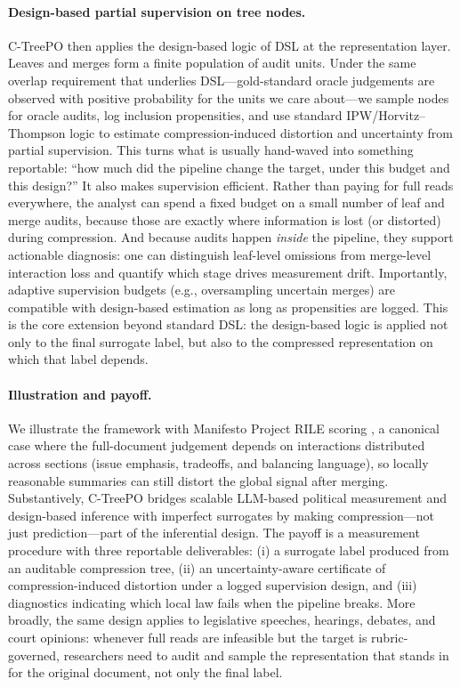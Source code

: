 \documentclass[11pt]{article}
\begin{document}
\paragraph{Design-based partial supervision on tree nodes.}
C-TreePO then applies the design-based logic of DSL at the representation layer. Leaves and merges form a finite population of audit units. Under the same overlap requirement that underlies DSL---gold-standard oracle judgements are observed with positive probability for the units we care about---we sample nodes for oracle audits, log inclusion propensities, and use standard IPW/Horvitz--Thompson logic to estimate compression-induced distortion and uncertainty from partial supervision. This turns what is usually hand-waved into something reportable: ``how much did the pipeline change the target, under this budget and this design?'' It also makes supervision efficient. Rather than paying for full reads everywhere, the analyst can spend a fixed budget on a small number of leaf and merge audits, because those are exactly where information is lost (or distorted) during compression. And because audits happen \emph{inside} the pipeline, they support actionable diagnosis: one can distinguish leaf-level omissions from merge-level interaction loss and quantify which stage drives measurement drift. Importantly, adaptive supervision budgets (e.g., oversampling uncertain merges) are compatible with design-based estimation as long as propensities are logged.
This is the core extension beyond standard DSL: the design-based logic is applied not only to the final surrogate label, but also to the compressed representation on which that label depends.

\paragraph{Illustration and payoff.}
We illustrate the framework with Manifesto Project RILE scoring \citep{ManifestoProject2025a}, a canonical case where the full-document judgement depends on interactions distributed across sections (issue emphasis, tradeoffs, and balancing language), so locally reasonable summaries can still distort the global signal after merging. Substantively, C-TreePO bridges scalable LLM-based political measurement \citep{BenoitEtAl2025} and design-based inference with imperfect surrogates \citep{EgamiEtAl2024} by making compression---not just prediction---part of the inferential design. The payoff is a measurement procedure with three reportable deliverables: (i) a surrogate label produced from an auditable compression tree, (ii) an uncertainty-aware certificate of compression-induced distortion under a logged supervision design, and (iii) diagnostics indicating which local law fails when the pipeline breaks. More broadly, the same design applies to legislative speeches, hearings, debates, and court opinions: whenever full reads are infeasible but the target is rubric-governed, researchers need to audit and sample the representation that stands in for the original document, not only the final label.

\clearpage

{\small}
\end{document}
